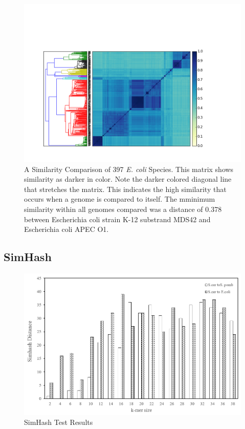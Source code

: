 \documentclass[12pt, letterpaper]{article}
\begin{document}
\begin{figure}[h]
    \centering
    \includegraphics[width=1.0\textwidth]{All_E_coli}
    \caption{A Similarity Comparison of 397 \textit{E. coli} Species. This matrix shows similarity as darker in color. Note the darker colored diagonal line that stretches the matrix. This indicates the high similarity that occurs when a genome is compared to itself. The mminimum similarity within all genomes compared was a distance of 0.378 between Escherichia coli strain K-12 substrand MDS42 and Escherichia coli APEC O1.}
    \label{fig:All Ecoli}
\end{figure}

\subsection{SimHash}
\begin{figure}[h!]
	\centering
	\includegraphics[width=1.0\textwidth]{Simhash_kmer_result.png}
	\caption{SimHash Test Results}
	\label{fig:SimHashDescription}
\end{figure}
\end{document}

